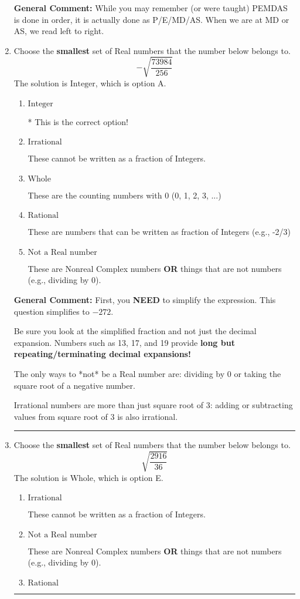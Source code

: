 \documentclass{extbook}[14pt]
\newcommand{\litem}[1]{\item #1

\rule{\textwidth}{0.4pt}}
\begin{document}
\begin{enumerate}
{\textbf{General Comment:} While you may remember (or were taught) PEMDAS is done in order, it is actually done as P/E/MD/AS. When we are at MD or AS, we read left to right.
}
\litem{
Choose the \textbf{smallest} set of Real numbers that the number below belongs to.
\[ -\sqrt{\frac{73984}{256}} \]The solution is \( \text{Integer} \), which is option A.\begin{enumerate}[label=\Alph*.]
\item \( \text{Integer} \)

* This is the correct option!
\item \( \text{Irrational} \)

These cannot be written as a fraction of Integers.
\item \( \text{Whole} \)

These are the counting numbers with 0 (0, 1, 2, 3, ...)
\item \( \text{Rational} \)

These are numbers that can be written as fraction of Integers (e.g., -2/3)
\item \( \text{Not a Real number} \)

These are Nonreal Complex numbers \textbf{OR} things that are not numbers (e.g., dividing by 0).
\end{enumerate}

\textbf{General Comment:} First, you \textbf{NEED} to simplify the expression. This question simplifies to $-272$. 
 
 Be sure you look at the simplified fraction and not just the decimal expansion. Numbers such as 13, 17, and 19 provide \textbf{long but repeating/terminating decimal expansions!} 
 
 The only ways to *not* be a Real number are: dividing by 0 or taking the square root of a negative number. 
 
 Irrational numbers are more than just square root of 3: adding or subtracting values from square root of 3 is also irrational.
}
\litem{
Choose the \textbf{smallest} set of Real numbers that the number below belongs to.
\[ \sqrt{\frac{2916}{36}} \]The solution is \( \text{Whole} \), which is option E.\begin{enumerate}[label=\Alph*.]
\item \( \text{Irrational} \)

These cannot be written as a fraction of Integers.
\item \( \text{Not a Real number} \)

These are Nonreal Complex numbers \textbf{OR} things that are not numbers (e.g., dividing by 0).
\item \( \text{Rational} \)


\end{enumerate}}
\end{enumerate}
\end{document}
